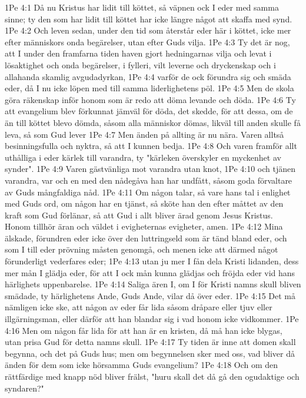 1Pe 4:1  Då nu Kristus har lidit till köttet, så väpnen ock I eder med samma sinne; ty den som har lidit till köttet har icke längre något att skaffa med synd.
1Pe 4:2  Och leven sedan, under den tid som återstår eder här i köttet, icke mer efter människors onda begärelser, utan efter Guds vilja.
1Pe 4:3  Ty det är nog, att I under den framfarna tiden haven gjort hedningarnas vilja och levat i lösaktighet och onda begärelser, i fylleri, vilt leverne och dryckenskap och i allahanda skamlig avgudadyrkan,
1Pe 4:4  varför de ock förundra sig och smäda eder, då I nu icke löpen med till samma liderlighetens pöl.
1Pe 4:5  Men de skola göra räkenskap inför honom som är redo att döma levande och döda.
1Pe 4:6  Ty att evangelium blev förkunnat jämväl för döda, det skedde, för att dessa, om de än till köttet blevo dömda, såsom alla människor dömas, likväl till anden skulle få leva, så som Gud lever
1Pe 4:7  Men änden på allting är nu nära. Varen alltså besinningsfulla och nyktra, så att I kunnen bedja.
1Pe 4:8  Och varen framför allt uthålliga i eder kärlek till varandra, ty "kärleken överskyler en myckenhet av synder".
1Pe 4:9  Varen gästvänliga mot varandra utan knot,
1Pe 4:10  och tjänen varandra, var och en med den nådegåva han har undfått, såsom goda förvaltare av Guds mångfaldiga nåd.
1Pe 4:11  Om någon talar, så vare hans tal i enlighet med Guds ord, om någon har en tjänst, så sköte han den efter måttet av den kraft som Gud förlänar, så att Gud i allt bliver ärad genom Jesus Kristus. Honom tillhör äran och väldet i evigheternas evigheter, amen.
1Pe 4:12  Mina älskade, förundren eder icke över den luttringseld som är tänd bland eder, och som I till eder prövning måsten genomgå, och menen icke att därmed något förunderligt vederfares eder;
1Pe 4:13  utan ju mer I fån dela Kristi lidanden, dess mer mån I glädja eder, för att I ock mån kunna glädjas och fröjda eder vid hans härlighets uppenbarelse.
1Pe 4:14  Saliga ären I, om I för Kristi namns skull bliven smädade, ty härlighetens Ande, Guds Ande, vilar då över eder.
1Pe 4:15  Det må nämligen icke ske, att någon av eder får lida såsom dråpare eller tjuv eller illgärningsman, eller därför att han blandar sig i vad honom icke vidkommer.
1Pe 4:16  Men om någon får lida för att han är en kristen, då må han icke blygas, utan prisa Gud för detta namns skull.
1Pe 4:17  Ty tiden är inne att domen skall begynna, och det på Guds hus; men om begynnelsen sker med oss, vad bliver då änden för dem som icke hörsamma Guds evangelium?
1Pe 4:18  Och om den rättfärdige med knapp nöd bliver frälst, "huru skall det då gå den ogudaktige och syndaren?"
